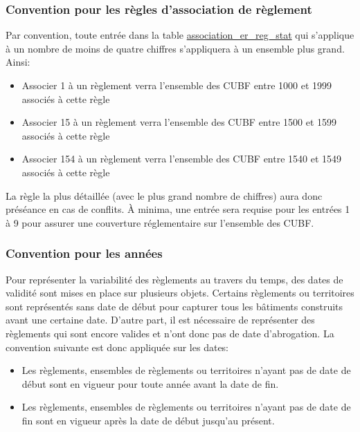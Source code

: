         \subsubsection{Convention pour les règles d'association de règlement}\label{sec:reg_association}
            Par convention, toute entrée dans la table \underline{association\_er\_reg\_stat} qui s'applique à un nombre de moins de quatre chiffres s'appliquera à un ensemble plus grand. Ainsi:
            \begin{itemize}
                \item Associer 1 à un règlement verra l'ensemble des \ac{CUBF} entre 1000 et 1999 associés à cette règle
                \item Associer 15 à un règlement verra l'ensemble des \ac{CUBF} entre 1500 et 1599 associés à cette règle
                \item Associer 154 à un règlement verra l'ensemble des \ac{CUBF} entre 1540 et 1549 associés à cette règle
            \end{itemize}
            La règle la plus détaillée (avec le plus grand nombre de chiffres) aura donc préséance en cas de conflits. À minima, une entrée sera requise pour les entrées 1 à 9 pour assurer une couverture réglementaire sur l'ensemble des \ac{CUBF}.\par
        
        \subsubsection{Convention pour les années}
            Pour représenter la variabilité des règlements au travers du temps, des dates de validité sont mises en place sur plusieurs objets. Certains règlements ou territoires sont représentés sans date de début pour capturer tous les bâtiments construits avant une certaine date. D'autre part, il est nécessaire de représenter des règlements qui sont encore valides et n'ont donc pas de date d'abrogation. La convention suivante est donc appliquée sur les dates:
            \begin{itemize}
                \item Les règlements, ensembles de règlements ou territoires n'ayant pas de date de début sont en vigueur pour toute année avant la date de fin. 
                \item Les règlements, ensembles de règlements ou territoires n'ayant pas de date de fin sont en vigueur après la date de début jusqu'au présent.
            \end{itemize}
        
